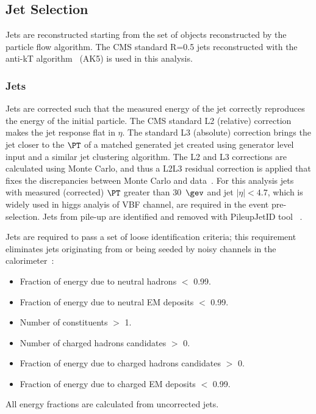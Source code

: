 \subsection{Jet Selection}
\label{sec:firstStep_jets}

Jets are reconstructed starting from the set of objects reconstructed by the particle flow algorithm\cite{pflow,CMS-PAS-JME-10-003,CMS-PAS-PFT-10-002}.
The CMS standard R=0.5 jets reconstructed with the anti-kT algorithm~\cite{cacciari} (AK5) is used in this analysis. 

\subsubsection{Jets}
Jets are corrected such that the measured energy of the jet 
correctly reproduces the energy of the initial particle. 
The CMS standard L2 (relative) correction makes the jet response flat in $\eta$.
The standard L3 (absolute) correction brings the jet closer to the $\PT$ of 
a matched generated jet created using generator level input and a similar 
jet clustering algorithm.
The L2 and L3 corrections are calculated using Monte Carlo, and thus a 
L2L3 residual correction is applied that fixes the discrepancies between 
Monte Carlo and data~\cite{newjes-cms}.
For this analysis jets with measured (corrected) $\PT$  
greater than 30~$\gev$ and jet $|\eta| < 4.7$, which is widely used in higgs analyis of VBF channel, are required in the event pre-selection.  Jets from pile-up are identified and removed with PileupJetID tool ~\cite{cite:PileupJetID}.

Jets are required to pass a set of loose identification
criteria; this requirement eliminates jets originating from or being seeded by
noisy channels in the calorimeter~\cite{Chatrchyan:2009hy}: 

\begin{itemize}
\item Fraction of energy due to neutral hadrons $<$ 0.99.
\item Fraction of energy due to neutral EM deposits $<$ 0.99.
\item Number of constituents $>$ 1.
\item Number of charged hadrons candidates $>$ 0.
\item Fraction of energy due to charged hadrons candidates $>$ 0.
\item Fraction of energy due to charged EM deposits $<$ 0.99.
\end{itemize}
All energy fractions are calculated from uncorrected jets.

